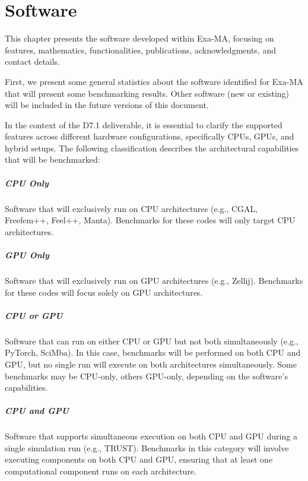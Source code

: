 \clearpage
\chapter{Software}
\label{sec:software}

This chapter presents the software developed within Exa-MA, focusing on features, mathematics, functionalities, publications, acknowledgments, and contact details.

First, we present some general statistics about the software identified for Exa-MA that will present some benchmarking results. 
Other software (new or existing) will be included in the future versions of this document.

In the context of the D7.1 deliverable, it is essential to clarify the supported features across different hardware configurations, specifically CPUs, GPUs, and hybrid setups. 
The following classification describes the architectural capabilities that will be benchmarked:

\paragraph{CPU Only}
Software that will exclusively run on CPU architectures (e.g., CGAL, Freefem++, Feel++, Manta). Benchmarks for these codes will only target CPU architectures.

\paragraph{GPU Only}
Software that will exclusively run on GPU architectures (e.g., Zellij). Benchmarks for these codes will focus solely on GPU architectures.

\paragraph{CPU or GPU}
Software that can run on either CPU or GPU but not both simultaneously (e.g., PyTorch, SciMba). In this case, benchmarks will be performed on both CPU and GPU, but no single run will execute on both architectures simultaneously. Some benchmarks may be CPU-only, others GPU-only, depending on the software's capabilities.

\paragraph{CPU and GPU}
Software that supports simultaneous execution on both CPU and GPU during a single simulation run (e.g., TRUST). Benchmarks in this category will involve executing components on both CPU and GPU, ensuring that at least one computational component runs on each architecture.


